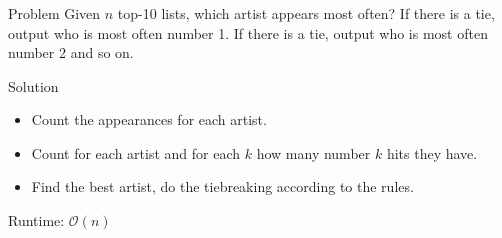 \begin{frame}
    \frametitle{\problemtitle}
    \begin{block}{Problem}
        Given $n$ top-10 lists, which artist appears most often?
        If there is a tie, output who is most often number 1.
        If there is a tie, output who is most often number 2 and so on.
    \end{block}
    \pause
    \begin{block}{Solution}
        \begin{itemize}
            \item Count the appearances for each artist.
            \item Count for each artist and for each $k$ how many number $k$ hits they have.
            \item Find the best artist, do the tiebreaking according to the rules.
        \end{itemize}
        Runtime: $\mathcal O(n)$
    \end{block}
    \pause
    \solvestats
\end{frame}
